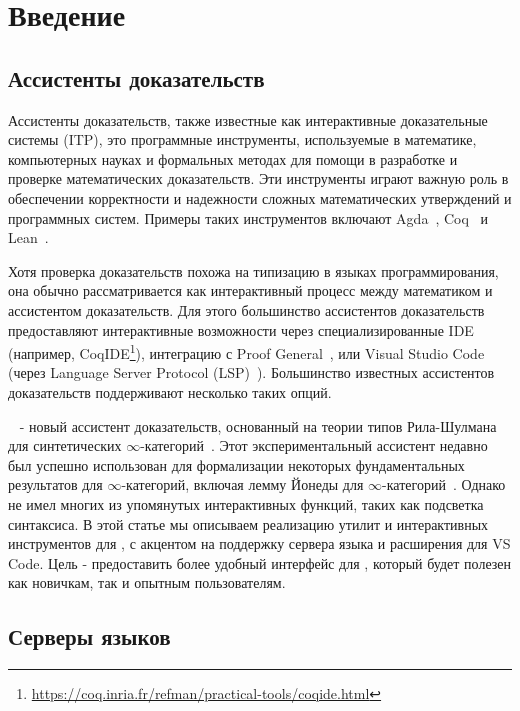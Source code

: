 \chapter{Введение}
\label{chap:intro}

\section{Ассистенты доказательств}

Ассистенты доказательств, также известные как интерактивные доказательные системы (ITP),
это программные инструменты, используемые в математике, компьютерных науках и формальных методах
для помощи в разработке и проверке математических доказательств.
Эти инструменты играют важную роль в обеспечении корректности и надежности
сложных математических утверждений и программных систем.
Примеры таких инструментов включают Agda~\cite{BoveDybjerNorell2009}, Coq~\cite{BertotCasteran2013} и Lean~\cite{deMouraUllrich2021}.

Хотя проверка доказательств похожа на типизацию в языках программирования,
она обычно рассматривается как интерактивный процесс между математиком и ассистентом доказательств.
Для этого большинство ассистентов доказательств предоставляют интерактивные возможности через специализированные IDE
(например, CoqIDE\footnote{\url{https://coq.inria.fr/refman/practical-tools/coqide.html}}),
интеграцию с Proof General~\cite{Aspinall2000}, или Visual Studio Code
(через Language Server Protocol (LSP)~\cite{Gunasinghe2022}).
Большинство известных ассистентов доказательств поддерживают несколько таких опций.

\Rzk{}~\cite{Kudasov2023-github-rzk} - новый ассистент доказательств, основанный на теории типов Рила-Шулмана для синтетических $\infty$-категорий~\cite{RiehlShulman2017, Riehl2023}.
Этот экспериментальный ассистент недавно был успешно использован для формализации некоторых фундаментальных результатов для $\infty$-категорий,
включая лемму Йонеды для $\infty$-категорий~\cite{Kudasov2023}.
Однако \Rzk{} не имел многих из упомянутых интерактивных функций, таких как подсветка синтаксиса.
В этой статье мы описываем реализацию утилит и интерактивных инструментов для \Rzk{},
с акцентом на поддержку сервера языка и расширения для VS Code.
Цель - предоставить более удобный интерфейс для \Rzk{}, который будет полезен как новичкам, так и опытным пользователям.

\section{Серверы языков}

